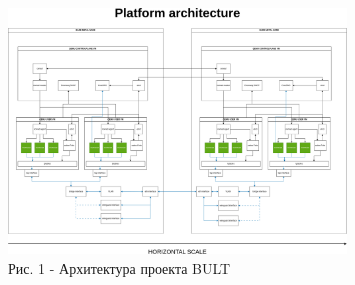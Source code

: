 \begin{figure}[H]
	\centering
	\includegraphics[width=0.8\textwidth]{media/ict/image18}
	\caption*{Рис. 1 - Архитектура проекта BULT}
\end{figure}

